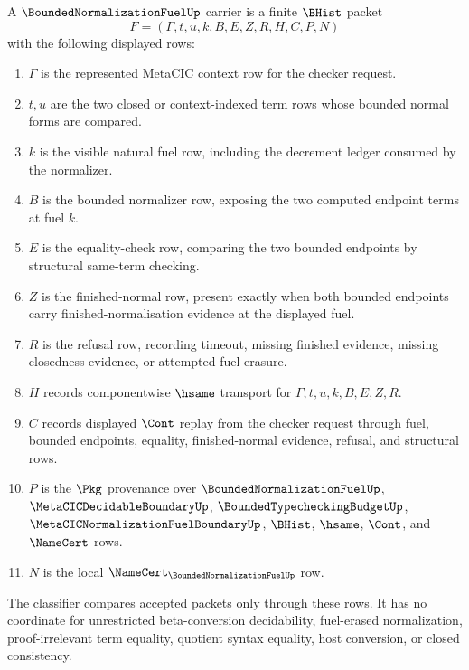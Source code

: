 \begin{definition}
\label{def:bounded-normalization-fuel-carrier}
A $\BoundedNormalizationFuelUp$ carrier is a finite $\BHist$ packet
$$
F=(\Gamma,t,u,k,B,E,Z,R,H,C,P,N)
$$
with the following displayed rows:
\begin{enumerate}
\item $\Gamma$ is the represented MetaCIC context row for the checker request.
\item $t,u$ are the two closed or context-indexed term rows whose bounded normal forms are compared.
\item $k$ is the visible natural fuel row, including the decrement ledger consumed by the normalizer.
\item $B$ is the bounded normalizer row, exposing the two computed endpoint terms at fuel $k$.
\item $E$ is the equality-check row, comparing the two bounded endpoints by structural same-term checking.
\item $Z$ is the finished-normal row, present exactly when both bounded endpoints carry finished-normalisation evidence at the displayed fuel.
\item $R$ is the refusal row, recording timeout, missing finished evidence, missing closedness evidence, or attempted fuel erasure.
\item $H$ records componentwise $\hsame$ transport for $\Gamma,t,u,k,B,E,Z,R$.
\item $C$ records displayed $\Cont$ replay from the checker request through fuel, bounded endpoints, equality, finished-normal evidence, refusal, and structural rows.
\item $P$ is the $\Pkg$ provenance over $\BoundedNormalizationFuelUp$, $\MetaCICDecidableBoundaryUp$, $\BoundedTypecheckingBudgetUp$, $\MetaCICNormalizationFuelBoundaryUp$, $\BHist$, $\hsame$, $\Cont$, and $\NameCert$ rows.
\item $N$ is the local $\NameCert_{\BoundedNormalizationFuelUp}$ row.
\end{enumerate}
The classifier compares accepted packets only through these rows. It has no coordinate for unrestricted beta-conversion decidability, fuel-erased normalization, proof-irrelevant term equality, quotient syntax equality, host conversion, or closed consistency.
\end{definition}


